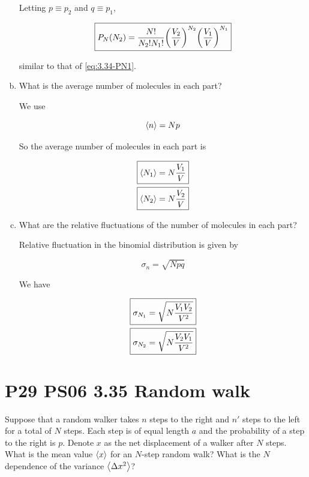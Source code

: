 \documentclass[9pt,a4paper,twocolumn]{article}
\begin{document}
\begin{enumerate}[(a)]
Letting $p \equiv p_2$ and $q \equiv p_1$,

\begin{equation}
	\boxed{
		P_N(N_2) = \frac{N!}{N_2!N_1!}\qty(\frac{V_2}{V})^{N_2}\qty(\frac{V_1}{V})^{N_1}
	} \label{eq:3.34-PN2}
\end{equation}

similar to that of \eqref{eq:3.34-PN1}.

\item What is the average number of molecules in each part?

We use

\begin{equation}
	\ev{n} = Np
\end{equation}

So the average number of molecules in each part is

\begin{align}
	\Aboxed{
		\ev{N_1} &= N\frac{V_1}{V}
	} \label{eq:3.34-avg-N1} \\
	\Aboxed{
		\ev{N_2} &= N\frac{V_2}{V}
	} \label{eq:3.34-avg-N2}
\end{align}

\item What are the relative fluctuations of the number of molecules in each part?

Relative fluctuation in the binomial distribution is given by

\begin{equation}
	\sigma_n = \sqrt{Npq} 
\end{equation}

We have

\begin{align}
	\Aboxed{
		\sigma_{N_1} &= \sqrt{N\frac{V_1 V_2}{V^2}}
	} \label{eq:3.34-sigmaN1} \\
	\Aboxed{
		\sigma_{N_2} &= \sqrt{N\frac{V_2 V_1}{V^2}}
	} \label{eq:3.34-sigmaN2}
\end{align}

\end{enumerate}

\section{P29 PS06 3.35 Random walk}
Suppose that a random walker takes $n$ steps to the right and $n'$ steps to the left for a total of $N$ steps. Each step is of equal length $a$ and the probability of a step to the right is $p$. Denote $x$ as the net displacement of a walker after $N$ steps. What is the mean value $\ev{x}$ for an $N$-step random walk? What is the $N$ dependence of the variance $\ev{\Delta x^2}$?
\end{document}
